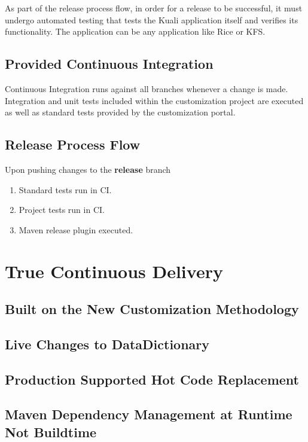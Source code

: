 \documentclass[12pt]{report}
\begin{document}
As part of the release process flow, in order for a release to be successful, it must undergo automated testing that tests
the Kuali application itself and verifies its functionality. The application can be any application like Rice or KFS. 

\subsection{Provided Continuous Integration}

Continuous Integration runs against all branches whenever a change is made. Integration and unit tests included within the
customization project are executed as well as standard tests provided by the customization portal.

\subsection{Release Process Flow}

Upon pushing changes to the \textbf{release} branch
\begin{enumerate}
  \item Standard tests run in CI.
  \item Project tests run in CI.
  \item Maven release plugin executed.
\end{enumerate}

\section{True Continuous Delivery}

\subsection{Built on the New Customization Methodology}

\subsection{Live Changes to DataDictionary}

\subsection{Production Supported Hot Code Replacement}

\subsection{Maven Dependency Management at Runtime Not Buildtime}
\end{document}
